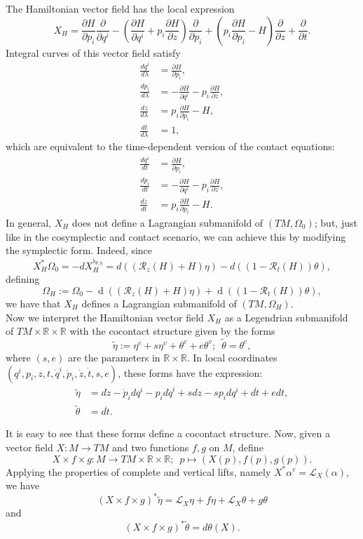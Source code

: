 \documentclass[12pt]{article}
\renewcommand{\d}{\operatorname{d}}
\newcommand{\partder}[2]{\frac{\partial #1}{\partial #2}}
\newcommand{\totder}[2]{\frac{d #1}{d #2}}
\begin{document}
The Hamiltonian vector field has the local expression 
$$X_H = \partder{H}{p_i} \partder{}{q^i} - \left (\partder{H}{q^i} + p_i\partder{H}{z} \right) \partder{}{p_i} + \left( p_i \partder{H}{p_i} - H\right ) \partder{}{z} + \partder{}{t}.$$
Integral curves of this vector field satisfy
\begin{align*}
\totder{q^i}{\lambda} &= \partder{H}{p_i},\\
\totder{p_i}{\lambda} &= - \partder{H}{q^i} - p_i \partder{H}{z},\\
\totder{z}{\lambda} &= p_i \partder{H}{p_i} - H,\\
\totder{t}{\lambda} &= 1,
\end{align*}
which are equivalent to the time-dependent version of the contact equations:
\begin{align*}
\totder{q^i}{t} &= \partder{H}{p_i},\\
\totder{p_i}{t} &= - \partder{H}{q^i} - p_i \partder{H}{z},\\
\totder{z}{t} &= p_i \partder{H}{p_i} - H.
\end{align*}
In general, $X_H$ does not define a Lagrangian submanifold of $(TM, \Omega_0)$; but, just like in the cosymplectic and contact scenario, we can achieve this by modifying the symplectic form. Indeed, since $$X_H^* \Omega_0 = - dX_H^{\flat_{\theta, \eta}} =   d\left((\mathcal{R}_z(H) + H) \eta\right) - d\left ((1 - \mathcal{R}_t(H)) \theta \right),$$ defining $$ \Omega_H := \Omega_0 - \d((\mathcal{R}_z(H) + H) \eta) + \d((1 - \mathcal{R}_t(H)) \theta),$$ we have that $X_H$ defines a Lagrangian submanifold of $(TM, \Omega_H).$\\

Now we interpret the Hamiltonian vector field $X_H$ as a Legendrian submanifold of $TM \times \mathbb{R} \times \mathbb{R}$ with the cocontact structure given by the forms $$\widetilde \eta := \eta^c + s \eta^v + \theta^c + e \theta^v; \,\,\, \widetilde \theta = \theta^c,$$ where $(s,e)$ are the parameters in $\mathbb{R} \times \mathbb{R}$. In local coordinates $(q^i, p_i, z, t, \dot{q}^i, \dot{p}_i, \dot{z}, \dot{t}, s,e)$, these forms have the expression:
\begin{align*}
\widetilde \eta &= d\dot{z} - \dot{p}_i dq^{i} - p_i d\dot{q}^i + s dz - sp_i dq^i + d\dot{t} + e dt, \\
\widetilde \theta &= d\dot{t}.
\end{align*}

It is easy to see that these forms define a cocontact structure. Now, given a vector field $X: M \rightarrow TM$ and two functions $f, g$ on $M$, define $$X \times f \times g: M \rightarrow TM \times \mathbb{R} \times \mathbb{R}; \,\,\, p \mapsto (X(p), f(p), g(p)).$$
Applying the properties of complete and vertical lifts, namely $X^*\alpha^c = \mathcal{L}_X(\alpha)$, we have
$$(X \times f \times g)^* \widetilde \eta = \mathcal{L}_X \eta + f \eta + \mathcal{L}_X \theta + g \theta$$ and $$(X \times f \times g)^*\widetilde \theta = d\theta(X).$$
\end{document}
